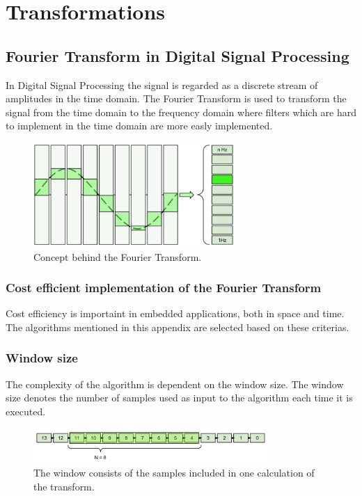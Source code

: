 \chapter{Transformations}
\section{Fourier Transform in Digital Signal Processing}\label{appendix:FT_in_DSP}

In Digital Signal Processing the signal is regarded as a discrete stream of amplitudes in the
time domain. The Fourier Transform is used to transform the signal from the time domain
to the frequency domain where filters which are hard to implement in the time domain are
more easly implemented.

\begin{figure}[H]
    \centering
    \includegraphics[height=150px]{figures/theory/ft_conceptual}
    \caption{Concept behind the Fourier Transform.}
    \label{fig:ft_conceptual}
\end{figure}
\subsection{Cost efficient implementation of the Fourier Transform}

Cost efficiency is importaint in embedded applications, both in space and time.
The algorithms mentioned in this appendix are selected based on these criterias.

\subsection{Window size}

The complexity of the algorithm is dependent on the window size. The window size
denotes the number of samples used as input to the algorithm each time it is executed.

\begin{figure}[H]
    \centering
    \includegraphics[height=50px]{figures/theory/dft_window}
    \caption{The window consists of the samples included in one calculation of the transform.}
    \label{fig:dft_window}
\end{figure}

